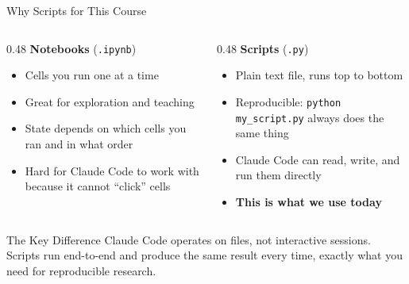 \documentclass[aspectratio=169, 11pt]{beamer}
\begin{document}
\begin{frame}{Why Scripts for This Course}
  \small
  \begin{columns}[T]
    \begin{column}{0.48\textwidth}
      \textbf{Notebooks} (\texttt{.ipynb})
      \begin{itemize}
        \item Cells you run one at a time
        \item Great for exploration and teaching
        \item State depends on which cells you ran and in what order
        \item Hard for Claude Code to work with because it cannot ``click'' cells
      \end{itemize}
    \end{column}
    \begin{column}{0.48\textwidth}
      \textbf{Scripts} (\texttt{.py})
      \begin{itemize}
        \item Plain text file, runs top to bottom
        \item Reproducible: \lstinline{python my_script.py} always does the same thing
        \item Claude Code can read, write, and run them directly
        \item \textbf{This is what we use today}
      \end{itemize}
    \end{column}
  \end{columns}

  \vspace{0.8em}
  \begin{alertblock}{The Key Difference}
    Claude Code operates on files, not interactive sessions. Scripts run end-to-end and produce the same result every time, exactly what you need for reproducible research.
  \end{alertblock}
\end{frame}
\end{document}

